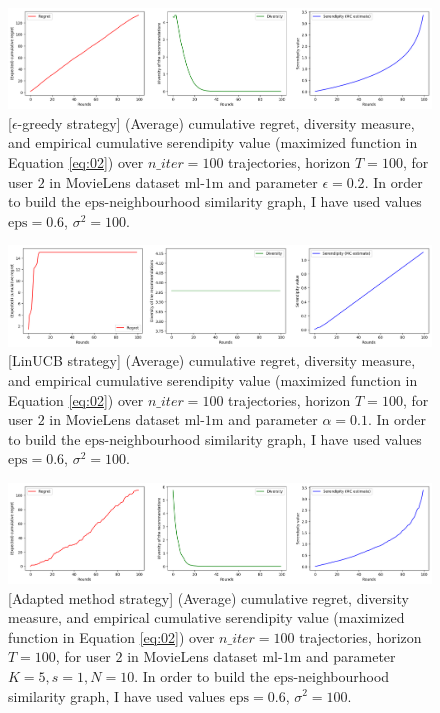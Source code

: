 \documentclass{article}
\begin{document}
\begin{figure}[H]
  \centering
  \includegraphics[scale=0.4]{../Results/ml-1m/greedy-1min30sec.png}
  \caption{[$\epsilon$-greedy strategy] (Average) cumulative regret, diversity measure, and empirical cumulative serendipity value (maximized function in Equation \ref{eq:02}) over $n\_iter=100$ trajectories, horizon $T=100$, for user $2$ in MovieLens dataset $\text{ml-1m}$ and parameter $\epsilon=0.2$. In order to build the $\text{eps}$-neighbourhood similarity graph, I have used values $\text{eps}=0.6$, $\sigma^{2}=100$.}
\label{figgreedy}
\end{figure}

\begin{figure}[H]
  \centering
  \includegraphics[scale=0.4]{../Results/ml-1m/linUCB-39sec.png}
  \caption{[LinUCB strategy] (Average) cumulative regret, diversity measure, and empirical cumulative serendipity value (maximized function in Equation \ref{eq:02}) over $n\_iter=100$ trajectories, horizon $T=100$, for user $2$ in MovieLens dataset $\text{ml-1m}$ and parameter $\alpha=0.1$. In order to build the $\text{eps}$-neighbourhood similarity graph, I have used values $\text{eps}=0.6$, $\sigma^{2}=100$.}
\label{figlinUCB}
\end{figure}

\begin{figure}[H]
  \centering
  \includegraphics[scale=0.4]{../Results/ml-1m/lagree-1min31sec.png}
  \caption{[Adapted method strategy] (Average) cumulative regret, diversity measure, and empirical cumulative serendipity value (maximized function in Equation \ref{eq:02}) over $n\_iter=100$ trajectories, horizon $T=100$, for user $2$ in MovieLens dataset $\text{ml-1m}$ and parameter $K=5, s=1, N=10$. In order to build the $\text{eps}$-neighbourhood similarity graph, I have used values $\text{eps}=0.6$, $\sigma^{2}=100$.}
\label{figlagree}
\end{figure}
\end{document}
